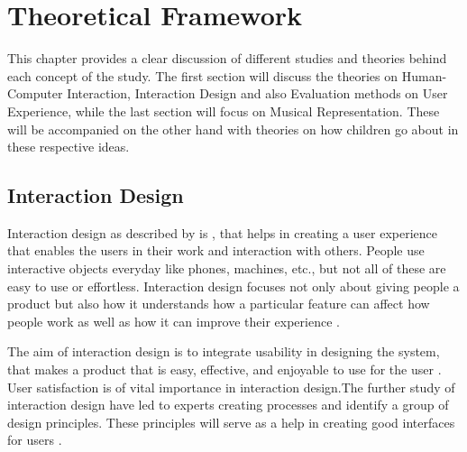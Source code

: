 %
%
%                 









\chapter{Theoretical Framework}

This chapter provides a clear discussion of different studies and theories
behind each concept of the study. 
The first section will discuss the theories on Human-Computer Interaction, Interaction Design and also Evaluation methods on User Experience, while the last section will focus on Musical Representation. These will be accompanied on the other hand with theories on how children go about in these respective ideas.

\section{Interaction Design} 
Interaction design as described by  is , that helps in creating a user experience that enables the users in their work and interaction with others. People use interactive objects everyday like phones, machines, etc., but not all of these are easy to use or effortless. Interaction design focuses not only about giving people a product but also how it understands how a particular feature can affect how people work as well as how it can improve their experience \cite{dix2009human,PreeceRogersSharp15}.

The aim of interaction design is to integrate usability in designing the system, that makes a product that is easy, effective, and enjoyable to use for the user \cite{PreeceRogersSharp15}. User satisfaction is of vital importance in interaction design.The further study of interaction design have led to experts creating processes and identify a group of design principles. These principles will serve as a help in creating good interfaces for users \cite{PreeceRogersSharp15}.

